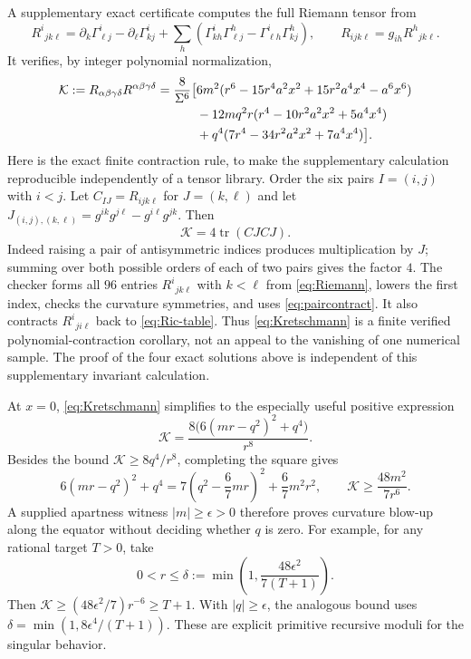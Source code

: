 \documentclass[11pt,a4paper]{article}
\numberwithin{equation}{section}
\theoremstyle{definition}\newtheorem{definition}[theorem]{Definition}
\theoremstyle{remark}\newtheorem{remark}[theorem]{Remark}
\newcommand{\tr}{\operatorname{tr}}
\begin{document}
A supplementary exact certificate computes the full Riemann tensor from
\begin{equation}\label{eq:Riemann}
 R^i{}_{j k\ell}=\partial_k\Gamma^i_{\ell j}-\partial_\ell\Gamma^i_{kj}
       +\sum_h(\Gamma^i_{kh}\Gamma^h_{\ell j}-\Gamma^i_{\ell h}\Gamma^h_{kj}),
 \qquad R_{ij k\ell}=g_{ih}R^h{}_{j k\ell}.
\end{equation}
It verifies, by integer polynomial normalization,
\begin{align}
 \mathcal K:=R_{\alpha\beta\gamma\delta}R^{\alpha\beta\gamma\delta}
 =\frac8{\Sigma^6}\bigl[{}&6m^2(r^6-15r^4a^2x^2+15r^2a^4x^4-a^6x^6)\notag\\
 &-12mq^2r(r^4-10r^2a^2x^2+5a^4x^4)\notag\\
 &+q^4(7r^4-34r^2a^2x^2+7a^4x^4)\bigr].\label{eq:Kretschmann}
\end{align}
Here is the exact finite contraction rule, to make the supplementary calculation reproducible independently of a tensor library. Order the six pairs $I=(i,j)$ with $i<j$. Let $C_{IJ}=R_{ij k\ell}$ for $J=(k,\ell)$ and let
$J_{(i,j),(k,\ell)}=g^{ik}g^{j\ell}-g^{i\ell}g^{jk}$.
Then
\begin{equation}\label{eq:paircontract}
 \mathcal K=4\tr(CJCJ).
\end{equation}
Indeed raising a pair of antisymmetric indices produces multiplication by $J$; summing over both possible orders of each of two pairs gives the factor $4$. The checker forms all $96$ entries $R^i{}_{j k\ell}$ with $k<\ell$ from \eqref{eq:Riemann}, lowers the first index, checks the curvature symmetries, and uses \eqref{eq:paircontract}. It also contracts $R^i{}_{j i\ell}$ back to \eqref{eq:Ric-table}. Thus \eqref{eq:Kretschmann} is a finite verified polynomial-contraction corollary, not an appeal to the vanishing of one numerical sample. The proof of the four exact solutions above is independent of this supplementary invariant calculation.

At $x=0$, \eqref{eq:Kretschmann} simplifies to the especially useful positive expression
\begin{equation}\label{eq:equatorK}
 \mathcal K=\frac{8\bigl(6(mr-q^2)^2+q^4\bigr)}{r^8}.
\end{equation}
Besides the bound $\mathcal K\ge8q^4/r^8$, completing the square gives
\[
 6(mr-q^2)^2+q^4
 =7\left(q^2-\frac67mr\right)^2+\frac67m^2r^2,
 \qquad \mathcal K\ge\frac{48m^2}{7r^6}.
\]
A supplied apartness witness $|m|\ge\epsilon>0$ therefore proves curvature blow-up along the equator without deciding whether $q$ is zero. For example, for any rational target $T>0$, take
\[
 0<r\le\delta:=\min\left(1,\frac{48\epsilon^2}{7(T+1)}\right).
\]
Then $\mathcal K\ge(48\epsilon^2/7)r^{-6}\ge T+1$. With $|q|\ge\epsilon$, the analogous bound uses $\delta=\min(1,8\epsilon^4/(T+1))$. These are explicit primitive recursive moduli for the singular behavior.
\end{document}
